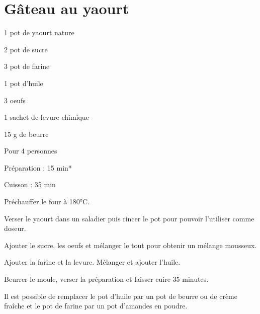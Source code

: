 \section{Gâteau au yaourt}

\begin{ingredients}
\item 1 pot de yaourt nature
\item 2 pot de sucre
\item 3 pot de farine
\item 1 pot d'huile
\item 3 oeufs
\item 1 sachet de levure chimique
\item 15 g de beurre
\end{ingredients}
\begin{infos}
\item Pour 4 personnes		%
\item Préparation : 15 min*		%
\item Cuisson : 35 min			%
\end{infos}
\begin{etapes}
\item Préchauffer le four à 180°C.
\item Verser le yaourt dans un saladier puis rincer le pot pour pouvoir l'utiliser comme doseur.
\item Ajouter le sucre, les oeufs et mélanger le tout pour obtenir un mélange mousseux.
\item Ajouter la farine et la levure. Mélanger et ajouter l'huile.
\item Beurrer le moule, verser la préparation et laisser cuire 35 minutes.
\end{etapes}
\begin{conseils}
Il est possible de remplacer le pot d'huile par un pot de beurre ou de crème fraîche et le pot de farine par un pot d'amandes en poudre. 
\end{conseils}
